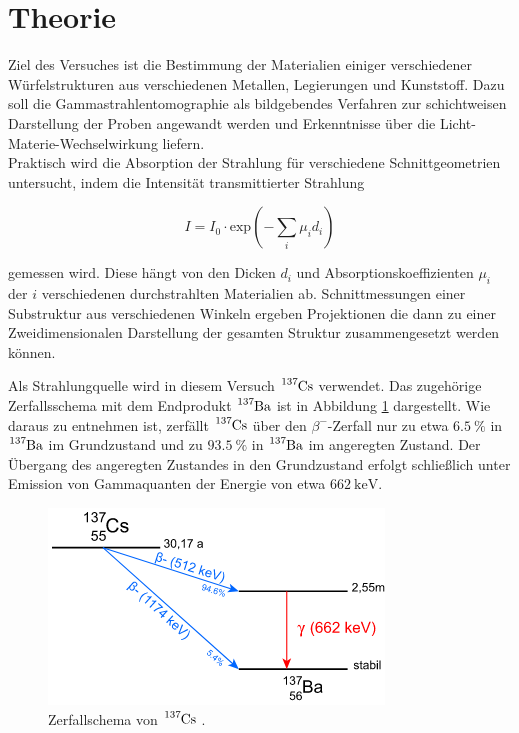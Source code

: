 \section{Theorie}
\label{sec:Theorie}

Ziel des Versuches ist die Bestimmung der Materialien einiger verschiedener Würfelstrukturen
aus verschiedenen Metallen, Legierungen und Kunststoff. Dazu soll die Gammastrahlentomographie als
bildgebendes Verfahren zur schichtweisen Darstellung der Proben
angewandt werden und Erkenntnisse über die Licht-Materie-Wechselwirkung liefern.\\

Praktisch wird die Absorption der Strahlung für verschiedene
Schnittgeometrien untersucht, indem die Intensität transmittierter
Strahlung

\vspace{-5pt}
\begin{equation}
    I = I_0 \cdot \text{exp}\left(- \sum_i \mu_i d_i \right)
    \label{eqn:int}
\end{equation}

gemessen wird. Diese hängt von den Dicken $d_i$ und Absorptionskoeffizienten $\mu_i$
der $i$ verschiedenen durchstrahlten Materialien ab.
Schnittmessungen einer Substruktur aus verschiedenen Winkeln ergeben Projektionen
die dann zu einer Zweidimensionalen Darstellung der gesamten Struktur zusammengesetzt
werden können.

Als Strahlungquelle wird in diesem Versuch $\ce{^{137}Cs}$ verwendet. Das zugehörige 
Zerfallsschema mit dem Endprodukt $\ce{^{137}Ba}$ ist in Abbildung \ref{fig:schema}
dargestellt. Wie daraus zu entnehmen ist, zerfällt $\ce{^{137}Cs}$ über den $\beta^{-}$-Zerfall nur zu etwa $\SI{6.5}{\percent}$
in $\ce{^{137}Ba}$ im Grundzustand und zu $\SI{93.5}{\percent}$ in $\ce{^{137}Ba}$ im angeregten Zustand.
Der Übergang des angeregten Zustandes in den Grundzustand erfolgt schließlich unter Emission von
Gammaquanten der Energie von etwa $\SI{662}{\kilo\eV}$.

\vspace{-15pt}
\begin{figure}
    \centering
    \includegraphics[scale=0.6]{content/schema.png}
    \caption{Zerfallschema von $\ce{^{137}Cs}$ \cite{leifi}.}
    \label{fig:schema}
\end{figure}
\vspace{-5pt}

